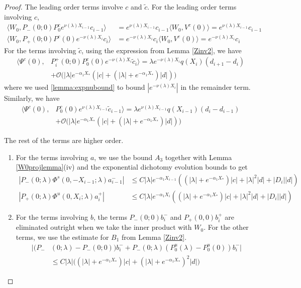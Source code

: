 \documentclass[thesis.tex]{subfiles}
\begin{document}
\begin{lemma}
\begin{proof}
The leading order terms involve $c$ and $\tilde{c}$. For the leading order terms involving $c$, 
\begin{align*}
\langle W_0, P_-(0; 0) P_0^c e^{\nu(\lambda) X_{i-1}} c_{i-1} \rangle &= e^{\nu(\lambda) X_{i-1}} c_{i-1}  \langle W_0, V^c(0) \rangle = e^{\nu(\lambda) X_{i-1}} c_{i-1} \\
\langle W_0, P_+(0; 0) P^c(0) e^{-\nu(\lambda) X_i} c_i \rangle &= e^{-\nu(\lambda) X_i} c_i \langle W_0, V^c(0)  \rangle = e^{-\nu(\lambda) X_i} c_i
\end{align*}
For the terms involving $\tilde{c}$, using the expression from Lemma \ref{Zinv2}, we have
\begin{align*}
\langle \Psi^c(0), &P_i^+(0; 0) P_0^c(0) e^{-\nu(\lambda)X_i} \tilde{c}_i \rangle
= \lambda e^{-\nu(\lambda)X_i} q(X_i) (d_{i+1} - d_i ) \\
&+ \mathcal{O}\Big( |\lambda| e^{-\alpha_1 X_*} \left( |c| + (|\lambda| + e^{-\alpha_1 X_*}) |d| \right) \Big)
\end{align*}
where we used \cref{lemma:expnubound} to bound $|e^{-\nu(\lambda)X_i}|$ in the remainder term. Similarly, we have
\begin{align*}
\langle \Psi^c(0), &P_0^c(0) e^{\nu(\lambda) X_{i-1}} \tilde{c}_{i-1} \rangle = \lambda e^{\nu(\lambda)X_{i-1}} q(X_{i-1}) (d_i - d_{i-1} ) \\
&+ \mathcal{O}\Big( |\lambda| e^{-\alpha_1 X_*} \left( |c| + (|\lambda| + e^{-\alpha_1 X_*}) |d| \right) \Big)
\end{align*}

The rest of the terms are higher order.
\begin{enumerate}

\item For the terms involving $a$, we use the bound $A_3$ together with Lemma \ref{W0projlemma}(iv) and the exponential dichotomy evolution bounds to get
\begin{align*}
|P_-(0; \lambda) \Phi^s(0, -X_{i-1}; \lambda) a_{i-1}^-| &\leq C |\lambda| e^{-\alpha_1 X_{i-1}} \left( (|\lambda| + e^{-\alpha_1 X_*})|c| + |\lambda|^2 |d| + |D_i||d| \right) \\
|P_+(0; \lambda) \Phi^u(0, X_i; \lambda) a_i^+| &\leq C |\lambda| e^{-\alpha_1 X_i}\left( (|\lambda| + e^{-\alpha_1 X_*})|c| + |\lambda|^2 |d| + |D_i||d| \right) 
\end{align*} 

\item For the terms involving $b$, the terms $P_-(0; 0) b_i^-$ and $P_+(0, 0)b_i^+$ are eliminated outright when we take the inner product with $W_0$. For the other terms, we use the estimate for $B_1$ from Lemma \ref{Zinv2}.
\begin{align*}
|(P_-&(0; \lambda) - P_-(0; 0))b_i^- + P_-(0; \lambda)(P_0^u(\lambda) - P_0^u(0))b_i^-| \\
&\leq C |\lambda|\Big( (|\lambda| + e^{-\alpha_1 X_*})|c| + (|\lambda| + e^{-\alpha_1 X_*})^2 |d| \Big)
\end{align*}


\end{enumerate}
\end{proof}
\end{lemma}
\end{document}
